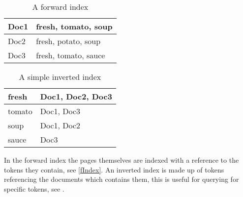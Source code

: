 \begin{minipage}{.40\textwidth}
  \centering
  \begin{table}[H]
	\centering
    \label{fIndex}
    \begin{tabular}{|l|l|}
\hline
Doc1 & fresh, tomato, soup \\ \hline
Doc2 & fresh, potato, soup \\ \hline
Doc3 & fresh, tomato, sauce \\ \hline
	\end{tabular}
	\caption{A forward index}
  \end{table}
\end{minipage}
\begin{minipage}{0.5\textwidth}
  \centering
  \begin{table}[H]
	\centering
    \label{iIndex}
    \begin{tabular}{|l|l|}
\hline
fresh & Doc1, Doc2, Doc3 \\ \hline
tomato & Doc1, Doc3 \\ \hline
soup & Doc1, Doc2 \\ \hline
sauce & Doc3 \\ \hline
	\end{tabular}
	\caption{A simple inverted index}
  \end{table}  
\end{minipage}

In the forward index the pages themselves are indexed with a reference to the
tokens they contain, see \autoref{fIndex}. An inverted index is made up of
tokens referencing the documents which contains them, this is useful for
querying for specific tokens, see \citep{Index3}.






